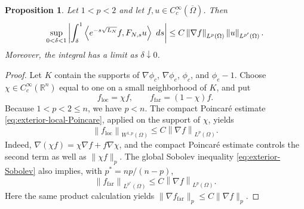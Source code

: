 \documentclass[10pt,a4paper]{amsart}
\newtheorem{proposition}{Proposition}
\newcommand\R{\mathbb{R}}
\newcommand{\abs}[1]{\left\lvert #1\right\rvert}
\newcommand\dd{\,{\rm d}}
\newcommand{\ip}[2]{\left\langle #1,#2\right\rangle}
\newcommand{\norm}[2]{\left\lVert #1\right\rVert_{#2}}
\begin{document}
\begin{proposition}\label{prop:small-pairing}
Let $1<p<2$ and let $f,u\in C_c^\infty(\overline\Omega)$.  Then
\begin{equation}\label{eq:small-pairing}
 \sup_{0<\delta<1}
 \abs{\int_\delta^1
 \ip{e^{-s\sqrt{L_N}}f}{F_{N,s}u}\,\dd s}
 \leq C\norm{\nabla f}{L^p(\Omega)}\norm u{L^{p'}(\Omega)}.
\end{equation}
Moreover, the integral has a limit as $\delta\downarrow0$.
\end{proposition}

\begin{proof}
Let $K$ contain the supports of $\nabla\phi_c$, $\nabla\phi_e$,
$\phi_c$, and $\phi_e-1$.  Choose
$\chi\in C_c^\infty(\R^n)$ equal to one on a small neighborhood of $K$,
and put
\[
 f_{\mathrm{loc}}=\chi f,\qquad f_{\mathrm{far}}=(1-\chi)f.
\]
Because $1<p<2\leq n$, we have $p<n$.  The compact Poincar\'e estimate
\eqref{eq:exterior-local-Poincare}, applied on the support of $\chi$, yields
\[
 \norm{f_{\mathrm{loc}}}{W^{1,p}(\Omega)}
 \leq C\norm{\nabla f}{L^p(\Omega)}.
\]
Indeed,
\(\nabla(\chi f)=\chi\nabla f+f\nabla\chi\), and the compact Poincar\'e
estimate controls the second term as well as \(\|\chi f\|_p\).
The global Sobolev inequality \eqref{eq:exterior-Sobolev} also implies, with
$p^*=np/(n-p)$,
\begin{equation}\label{eq:ffar-pstar}
 \norm{f_{\mathrm{far}}}{L^{p^*}(\Omega)}
 \leq C\norm{\nabla f}{L^p(\Omega)}.
\end{equation}
Here the same product calculation yields
\(\|\nabla f_{\mathrm{far}}\|_p\leq C\|\nabla f\|_p\).


\end{proof}
\end{document}
